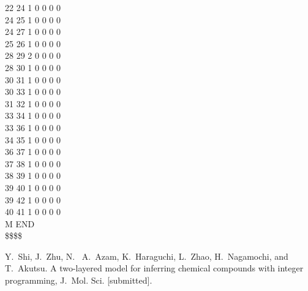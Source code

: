 \documentclass[11pt,titlepage,dvipdfmx,twoside]{article}
\begin{document}
\begin{oframed}
{ 22 24  1  0  0  0  0                                                   \\
 24 25  1  0  0  0  0                                                   \\
 24 27  1  0  0  0  0                                                   \\
 25 26  1  0  0  0  0                                                   \\
 28 29  2  0  0  0  0                                                   \\
 28 30  1  0  0  0  0                                                   \\
 30 31  1  0  0  0  0                                                   \\
 30 33  1  0  0  0  0                                                   \\
 31 32  1  0  0  0  0                                                   \\
 33 34  1  0  0  0  0                                                   \\
 33 36  1  0  0  0  0                                                   \\
 34 35  1  0  0  0  0                                                   \\
 36 37  1  0  0  0  0                                                   \\
 37 38  1  0  0  0  0                                                   \\
 38 39  1  0  0  0  0                                                   \\
 39 40  1  0  0  0  0                                                   \\
 39 42  1  0  0  0  0                                                   \\
 40 41  1  0  0  0  0                                                   \\
M  END                                                                  \\
\$\$\$\$                                                                \\
}
\end{oframed}
\begin{thebibliography}{10}
	  Y.~Shi, J.~Zhu, N.~ A.~Azam, K.~Haraguchi, 
	  L.~Zhao, H.~Nagamochi, and T.~Akutsu. 
	  A two-layered model for inferring chemical
compounds with integer programming, 
	  J.~Mol. Sci. [submitted]. 
\end{thebibliography}
\end{document}
